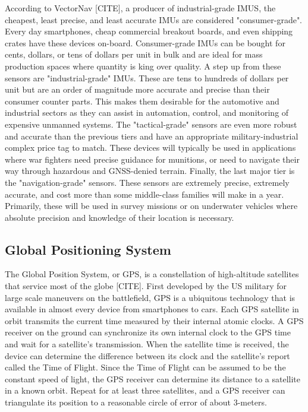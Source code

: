 According to VectorNav [CITE], a producer of industrial-grade IMUS, the cheapest, least precise, and least accurate IMUs are considered "consumer-grade".
Every day smartphones, cheap commercial breakout boards, and even shipping crates have these devices on-board.
Consumer-grade IMUs can be bought for cents, dollars, or tens of dollars per unit in bulk and are ideal for mass production spaces where quantity is king over quality.
A step up from these sensors are "industrial-grade" IMUs. 
These are tens to hundreds of dollars per unit but are an order of magnitude more accurate and precise than their consumer counter parts.
This makes them desirable for the automotive and industrial sectors as they can assist in automation, control, and monitoring of expensive unmanned systems.
The "tactical-grade" sensors are even more robust and accurate than the previous tiers and have an appropriate military-industrial complex price tag to match. 
These devices will typically be used in applications where war fighters need precise guidance for munitions, or need to navigate their way through hazardous and GNSS-denied terrain.
Finally, the last major tier is the "navigation-grade" sensors. 
These sensors are extremely precise, extremely accurate, and cost more than some middle-class families will make in a year.
Primarily, these will be used in survey missions or on underwater vehicles where absolute precision and knowledge of their location is necessary.

\subsection{Global Positioning System} \label{ssec:bkg_gps}
The Global Position System, or GPS, is a constellation of high-altitude satellites that service most of the globe [CITE].
First developed by the US military for large scale maneuvers on the battlefield, GPS is a ubiquitous technology that is available in almost every device from smartphones to cars.
Each GPS satellite in orbit transmits the current time measured by their internal atomic clocks.
A GPS receiver on the ground can synchronize its own internal clock to the GPS time and wait for a satellite's transmission.
When the satellite time is received, the device can determine the difference between its clock and the satellite's report called the Time of Flight.
Since the Time of Flight can be assumed to be the constant speed of light, the GPS receiver can determine its distance to a satellite in a known orbit.
Repeat for at least three satellites, and a GPS receiver can triangulate its position to a reasonable circle of error of about 3-meters.

